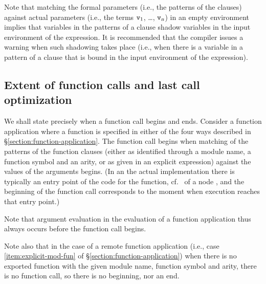 Note that matching the formal parameters (i.e., the patterns of the
clauses) against actual parameters
(i.e., the terms ${\tt{\sl v}}_1$, \ldots,
${\tt{\sl v}}_{\mbox{\scriptsize\tt{\sl{n}}}}$) in an empty environment implies that
variables in the patterns of a clause shadow variables
in the input environment of the  expression. It is recommended that
the compiler issues a warning when such shadowing takes place (i.e., when
there is a variable in a pattern of a  clause that is bound in the
input environment of the  expression).

\subsection{Extent of function calls and last call optimization}

\label{section:extent-function-calls}

We shall state precisely when a function call begins and ends.
Consider a function application where a function is specified in either
of the four ways described in \S\ref{section:function-application}.
The function call begins when matching of the patterns of the function clauses
(either as identified through a module name, a function symbol and an arity,
or as given in an explicit  expression) against the values of the
arguments begins.  (In \ifStd an \fi \ifOld the \fi
actual implementation there is \ifStd typically \fi an
entry point of the code for the function, cf.~ of
a node , and the beginning of the function call corresponds to the
moment when execution reaches that entry point.)

Note that argument evaluation in the evaluation of a function application thus
always occurs before the function call begins.

Note also that in the case of a remote function application (i.e., case
\ref{item:explicit-mod-fun} of \S\ref{section:function-application}) when there
is no exported function with the given module name, function symbol and arity,
there is no function call, so there is no beginning, nor an end.

